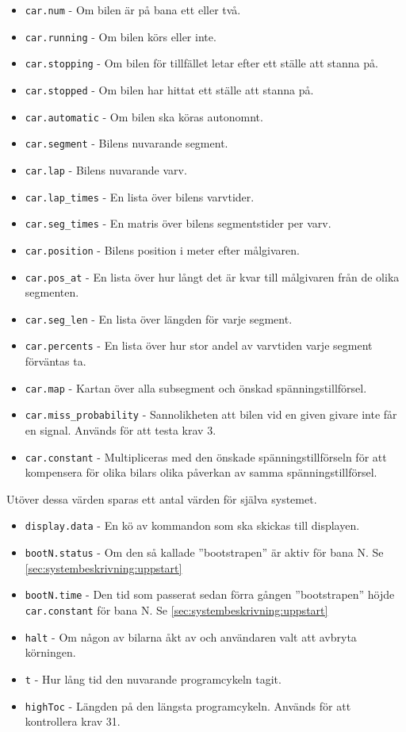 \begin{itemize}

\item \texttt{car.num} - Om bilen är på bana ett eller två.
\item \texttt{car.running} - Om bilen körs eller inte.
\item \texttt{car.stopping} - Om bilen för tillfället letar efter ett ställe att stanna på.
\item \texttt{car.stopped} - Om bilen har hittat ett ställe att stanna på.
\item \texttt{car.automatic} - Om bilen ska köras autonomnt.
\item \texttt{car.segment} - Bilens nuvarande segment.
\item \texttt{car.lap} - Bilens nuvarande varv.
\item \texttt{car.lap\_times} - En lista över bilens varvtider.
\item \texttt{car.seg\_times} - En matris över bilens segmentstider per varv.
\item \texttt{car.position} - Bilens position i meter efter målgivaren.
\item \texttt{car.pos\_at} - En lista över hur långt det är kvar till målgivaren från de olika segmenten.
\item \texttt{car.seg\_len} - En lista över längden för varje segment.
\item \texttt{car.percents} - En lista över hur stor andel av varvtiden varje segment förväntas ta.
\item \texttt{car.map} - Kartan över alla subsegment och önskad spänningstillförsel.
\item \texttt{car.miss\_probability} - Sannolikheten att bilen vid en given givare inte får en signal. Används för att testa krav 3.
\item \texttt{car.constant} - Multipliceras med den önskade spänningstillförseln för att
	kompensera för olika bilars olika påverkan av samma spänningstillförsel.

\end{itemize}


Utöver dessa värden sparas ett antal värden för själva systemet.

\begin{itemize}

	\item \texttt{display.data} - En kö av kommandon som ska skickas till displayen.
	\item \texttt{bootN.status} - Om den så kallade ''bootstrapen'' är aktiv för bana N. Se \ref{sec:systembeskrivning:uppstart}
	\item \texttt{bootN.time} - Den tid som passerat sedan förra gången ''bootstrapen'' höjde \texttt{car.constant} för bana N. Se 
	\ref{sec:systembeskrivning:uppstart}
	\item \texttt{halt} - Om någon av bilarna åkt av och användaren valt att avbryta körningen.
	\item \texttt{t} - Hur lång tid den nuvarande programcykeln tagit.
	\item \texttt{highToc} - Längden på den längsta programcykeln. Används för att kontrollera krav 31.

\end{itemize}
